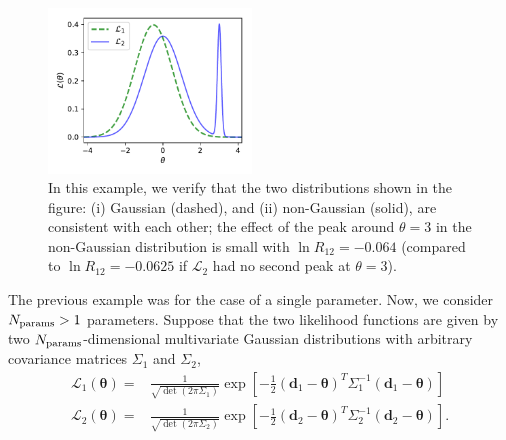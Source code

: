 \documentclass[amsmath, amssymb, reprint, aps]{revtex4-1}
\newcommand{\donev}{\textbf{d}_1}
\newcommand{\dtwov}{\textbf{d}_2}
\newcommand{\tv}{\bm{\theta}}
\begin{document}
{        \begin{figure}
            \centering
            \includegraphics[width=0.48\textwidth]{nongaus2.pdf}
            \caption{In this example, we verify that the two distributions shown in the figure: (i) Gaussian (dashed), and (ii) non-Gaussian (solid), are consistent with each other; the effect of the peak around $\theta=3$ in the non-Gaussian distribution is small with $\ln R_{12}=-0.064$ (compared to $\ln R_{12}=-0.0625$ if $\mathcal{L}_2$ had no second peak at $\theta=3$).}
            \label{fig:example1}
        \end{figure}
        
        The previous example was for the case of a single parameter. Now, we consider $N_{\rm params}>1$ parameters. Suppose that the two likelihood functions are given by two $N_{\rm params}$-dimensional multivariate Gaussian distributions with arbitrary covariance matrices $\Sigma_1$ and $\Sigma_2$,
        \begin{align}
            \mathcal{L}_1(\tv) =& \frac{1}{\sqrt{\det(2\pi \Sigma_1)}} \exp\left[{-\frac{1}{2}}(\donev-\tv)^T \Sigma_1^{-1} (\donev-\tv)\right] \nonumber \\
            \mathcal{L}_2(\tv) =& \frac{1}{\sqrt{\det(2\pi \Sigma_2)}} \exp\left[{-\frac{1}{2}}(\dtwov-\tv)^T \Sigma_2^{-1} (\dtwov-\tv)\right].\nonumber
        \end{align}
        
}
\end{document}
